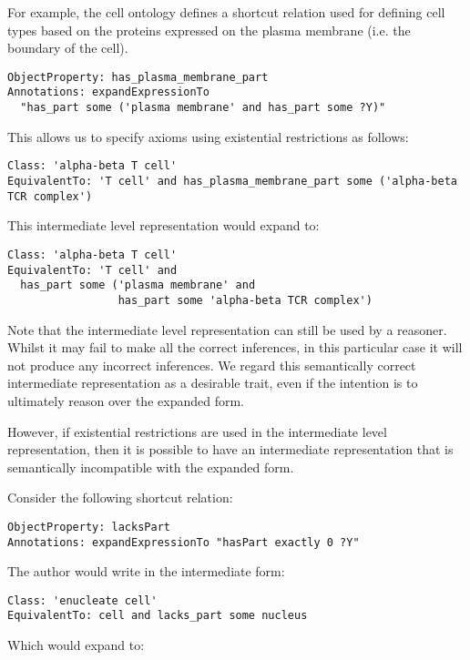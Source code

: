 \documentclass{llncs}
\begin{document}
For example, the cell ontology defines a shortcut relation used for
defining cell types based on the proteins expressed on the plasma
membrane (i.e. the boundary of the cell)\cite{Masci2009}.

\begin{verbatim}
ObjectProperty: has_plasma_membrane_part
Annotations: expandExpressionTo 
  "has_part some ('plasma membrane' and has_part some ?Y)"
\end{verbatim}

This allows us to specify axioms using existential restrictions as follows:

\begin{verbatim}
Class: 'alpha-beta T cell'
EquivalentTo: 'T cell' and has_plasma_membrane_part some ('alpha-beta TCR complex')
\end{verbatim}

This intermediate level representation would expand to:

\begin{verbatim}
Class: 'alpha-beta T cell'
EquivalentTo: 'T cell' and 
  has_part some ('plasma membrane' and 
                 has_part some 'alpha-beta TCR complex')
\end{verbatim}

Note that the intermediate level representation can still be used by a
reasoner. Whilst it may fail to make all the correct inferences, in
this particular case it will not produce any incorrect inferences. We
regard this semantically correct intermediate representation as a
desirable trait, even if the intention is to ultimately reason over
the expanded form.

However, if existential restrictions are used in the intermediate
level representation, then it is possible to have an intermediate
representation that is semantically incompatible with the expanded
form.

Consider the following shortcut relation:

\begin{verbatim}
ObjectProperty: lacksPart
Annotations: expandExpressionTo "hasPart exactly 0 ?Y"
\end{verbatim}

The author would write in the intermediate form:

\begin{verbatim}
Class: 'enucleate cell'
EquivalentTo: cell and lacks_part some nucleus
\end{verbatim}

Which would expand to:
\end{document}
